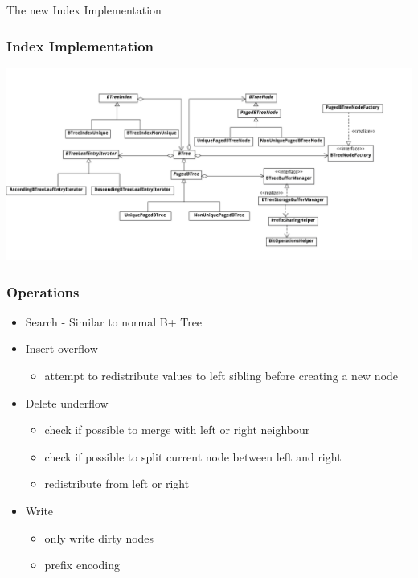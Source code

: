 \documentclass{beamer}
\begin{document}
  \begin{section}{The new Index Implementation}
    \begin{frame}
        \frametitle{Index Implementation}
        \includegraphics[scale=0.065]{ZooDBClassDiagram} 
    \end{frame}

    \begin{frame}
        \frametitle{Operations}
        \begin{itemize}
        \item Search - Similar to normal B+ Tree
        \item Insert overflow
            \begin{itemize}
            \item attempt to redistribute values to left sibling before creating a new node
            \end{itemize}
        \item Delete underflow
            \begin{itemize}
            \item check if possible to merge with left or right neighbour
            \item check if possible to split current node between left and right
            \item redistribute from left or right
            \end{itemize}
        \item Write
            \begin{itemize}
              \item only write dirty nodes
              \item prefix encoding
            \end{itemize}
        \end{itemize}
    \end{frame}
  \end{section}
\end{document}
